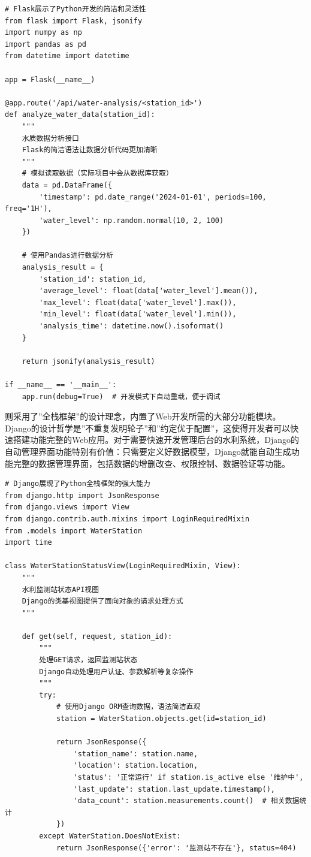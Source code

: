 \begin{lstlisting}[style=python]
# Flask展示了Python开发的简洁和灵活性
from flask import Flask, jsonify
import numpy as np
import pandas as pd
from datetime import datetime

app = Flask(__name__)

@app.route('/api/water-analysis/<station_id>')
def analyze_water_data(station_id):
    """
    水质数据分析接口
    Flask的简洁语法让数据分析代码更加清晰
    """
    # 模拟读取数据（实际项目中会从数据库获取）
    data = pd.DataFrame({
        'timestamp': pd.date_range('2024-01-01', periods=100, freq='1H'),
        'water_level': np.random.normal(10, 2, 100)
    })
    
    # 使用Pandas进行数据分析
    analysis_result = {
        'station_id': station_id,
        'average_level': float(data['water_level'].mean()),
        'max_level': float(data['water_level'].max()),
        'min_level': float(data['water_level'].min()),
        'analysis_time': datetime.now().isoformat()
    }
    
    return jsonify(analysis_result)

if __name__ == '__main__':
    app.run(debug=True)  # 开发模式下自动重载，便于调试
\end{lstlisting}

则采用了''全栈框架''的设计理念，内置了Web开发所需的大部分功能模块。Django的设计哲学是''不重复发明轮子''和''约定优于配置''，这使得开发者可以快速搭建功能完整的Web应用。对于需要快速开发管理后台的水利系统，Django的自动管理界面功能特别有价值：只需要定义好数据模型，Django就能自动生成功能完整的数据管理界面，包括数据的增删改查、权限控制、数据验证等功能。

\begin{lstlisting}[style=python]
# Django展现了Python全栈框架的强大能力
from django.http import JsonResponse
from django.views import View
from django.contrib.auth.mixins import LoginRequiredMixin
from .models import WaterStation
import time

class WaterStationStatusView(LoginRequiredMixin, View):
    """
    水利监测站状态API视图
    Django的类基视图提供了面向对象的请求处理方式
    """
    
    def get(self, request, station_id):
        """
        处理GET请求，返回监测站状态
        Django自动处理用户认证、参数解析等复杂操作
        """
        try:
            # 使用Django ORM查询数据，语法简洁直观
            station = WaterStation.objects.get(id=station_id)
            
            return JsonResponse({
                'station_name': station.name,
                'location': station.location,
                'status': '正常运行' if station.is_active else '维护中',
                'last_update': station.last_update.timestamp(),
                'data_count': station.measurements.count()  # 相关数据统计
            })
        except WaterStation.DoesNotExist:
            return JsonResponse({'error': '监测站不存在'}, status=404)
\end{lstlisting}

